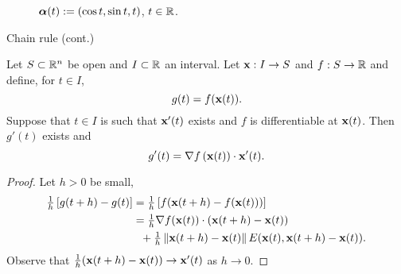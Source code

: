 \vspace{-2.5em}
\begin{figure}
    \caption{\(\boldsymbol{\alpha}(t):=(\cos t, \sin t, t)\), \(t\in \mathbb{R}\).}
\end{figure}








{Chain rule (cont.)}

\begin{theorem}
    Let \(S\subset \mathbb{R}^n\) be open and \(I\subset \mathbb{R}\) an interval.
    Let \(\mathbf{x}: I \to S\) and \(f:S \to \mathbb{R}\) and define, for \(t\in I\),
    \[
        g(t) = f (\mathbf{x}(t)).
    \]
    Suppose that  \(t\in I\) is such that \(\mathbf{x}'(t)\) exists and \(f\) is differentiable at \(\mathbf{x}(t)\).
    Then \(g'(t)\) exists and
    \[
        g'(t) = \nabla f \left(\mathbf{x}(t)\right) \cdot \mathbf{x}'(t).
    \]
\end{theorem}


\vspace{-.5em}

\begin{proof}
    Let \(h>0\) be small, \vspace{-.5em}
    \[
        \begin{aligned}
            \tfrac{1}{h}\left[g(t+h)-g(t) \right]
             & = \tfrac{1}{h}\left[f(\mathbf{x}(t+h)-f(\mathbf{x}(t)))\right]                        \\
             & = \tfrac{1}{h} \nabla f(\mathbf{x}(t))\cdot (\mathbf{x}(t+h)-\mathbf{x}(t))                  \\
             & \ \ +  \tfrac{1}{h}  \left\|\mathbf{x}(t+h)-\mathbf{x}(t)\right\| E(\mathbf{x}(t), \mathbf{x}(t+h)-\mathbf{x}(t)).
        \end{aligned}
    \]
    Observe that \(\tfrac{1}{h}  (\mathbf{x}(t+h)-\mathbf{x}(t)) \to \mathbf{x}'(t)  \) as \(h\to 0\).
\end{proof}



